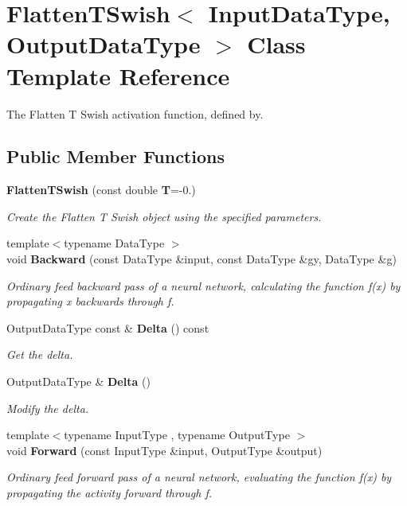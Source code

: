 \section{Flatten\+T\+Swish$<$ Input\+Data\+Type, Output\+Data\+Type $>$ Class Template Reference}
\label{classmlpack_1_1ann_1_1FlattenTSwish}


The Flatten T Swish activation function, defined by.  


\subsection*{Public Member Functions}
\begin{DoxyCompactItemize}
\item 
\textbf{ Flatten\+T\+Swish} (const double \textbf{ T}=-\/0.)
\begin{DoxyCompactList}\small\item\em Create the Flatten T Swish object using the specified parameters. \end{DoxyCompactList}\item 
{\footnotesize template$<$typename Data\+Type $>$ }\\void \textbf{ Backward} (const Data\+Type \&input, const Data\+Type \&gy, Data\+Type \&g)
\begin{DoxyCompactList}\small\item\em Ordinary feed backward pass of a neural network, calculating the function f(x) by propagating x backwards through f. \end{DoxyCompactList}\item 
Output\+Data\+Type const  \& \textbf{ Delta} () const
\begin{DoxyCompactList}\small\item\em Get the delta. \end{DoxyCompactList}\item 
Output\+Data\+Type \& \textbf{ Delta} ()
\begin{DoxyCompactList}\small\item\em Modify the delta. \end{DoxyCompactList}\item 
{\footnotesize template$<$typename Input\+Type , typename Output\+Type $>$ }\\void \textbf{ Forward} (const Input\+Type \&input, Output\+Type \&output)
\begin{DoxyCompactList}\small\item\em Ordinary feed forward pass of a neural network, evaluating the function f(x) by propagating the activity forward through f. \end{DoxyCompactList}\item 

\end{DoxyCompactItemize}
